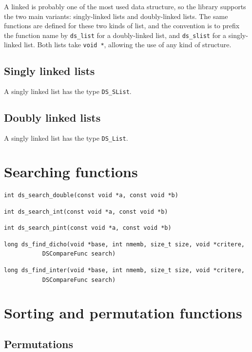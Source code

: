 A linked  is probably one of the most used data structure, so the
library supports the two main variants: singly-linked lists and
doubly-linked lists.
The same functions are defined for these two kinds of list, and the
convention is to prefix the function name by \verb|ds_list| for
a doubly-linked list, and \verb|ds_slist| for a singly-linked list.
Both lists take \verb|void *|, allowing the use of any kind of structure.

\subsection{Singly linked lists}

A singly linked list has the type \verb|DS_SList|.

\subsection{Doubly linked lists}

A singly linked list has the type \verb|DS_List|.

\section{Searching functions}

\begin{verbatim}
int ds_search_double(const void *a, const void *b)
\end{verbatim}
\begin{verbatim}
int ds_search_int(const void *a, const void *b)
\end{verbatim}
\begin{verbatim}
int ds_search_pint(const void *a, const void *b)
\end{verbatim}
\begin{verbatim}
long ds_find_dicho(void *base, int nmemb, size_t size, void *critere,
		   DSCompareFunc search)
\end{verbatim}
\begin{verbatim}
long ds_find_inter(void *base, int nmemb, size_t size, void *critere,
		   DSCompareFunc search)
\end{verbatim}

\section{Sorting and permutation functions}

\subsection{Permutations}
\label{sec:permutations}

